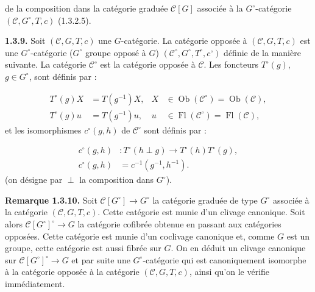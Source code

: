 %
de la composition dans la catégorie graduée $\mathcal C[G]$ associée à
la $G^\circ$-catégorie $(\mathcal C,G^\circ,T,c)$ (1.3.2.5).

\noindent\textbf{1.3.9.}\quad
Soit $(\mathcal C,G,T,c)$ une $G$-catégorie. La catégorie opposée à
$(\mathcal C,G,T,c)$ est une $G^\circ$-catégorie ($G^\circ$ groupe
opposé à $G$) $(\mathcal C^\circ,G^\circ,T^\circ,c^\circ)$ définie de
la manière suivante. La catégorie $\mathcal C^\circ$ est la catégorie
opposée à $\mathcal C$. Les foncteurs $T^\circ(g)$, $g\in G^\circ$,
sont définis par :

\begin{equation}
  \begin{aligned}
    T^\circ(g)X &= T(g^{-1})X,
      & X&\in\operatorname{Ob}(\mathcal C^\circ)
             =\operatorname{Ob}(\mathcal C),\\
    T^\circ(g)u &= T(g^{-1})u,
      & u&\in\operatorname{Fl}(\mathcal C^\circ)
             =\operatorname{Fl}(\mathcal C),
  \end{aligned}
  \tag{1.3.9.1}
\end{equation}
et les isomorphismes $c^\circ(g,h)$ de $\mathcal C^\circ$ sont définis
par :

\begin{equation}
  \begin{aligned}
    c^\circ(g,h)&\colon
      T^\circ(h\perp g)\longrightarrow T^\circ(h)T^\circ(g),\\
    c^\circ(g,h)&=c^{-1}(g^{-1},h^{-1}).
  \end{aligned}
  \tag{1.3.9.2}
\end{equation}
(on désigne par $\perp$ la composition dans $G^\circ$).

\noindent\textbf{Remarque 1.3.10.}\quad
Soit $\mathcal C[G^\circ]\longrightarrow G^\circ$ la catégorie graduée
de type $G^\circ$ associée à la catégorie $(\mathcal C,G,T,c)$. Cette
catégorie est munie d'un clivage canonique. Soit alors
$\mathcal C[G^\circ]^\circ\longrightarrow G$ la catégorie cofibrée
obtenue en passant aux catégories opposées. Cette catégorie est munie
d'un coclivage canonique et, comme $G$ est un groupe, cette catégorie
est aussi fibrée sur $G$. On en déduit un clivage canonique sur
$\mathcal C[G^\circ]^\circ\longrightarrow G$ et par suite une
$G^\circ$-catégorie qui est canoniquement isomorphe à la catégorie
opposée à la catégorie $(\mathcal C,G,T,c)$, ainsi qu'on le vérifie
immédiatement.

